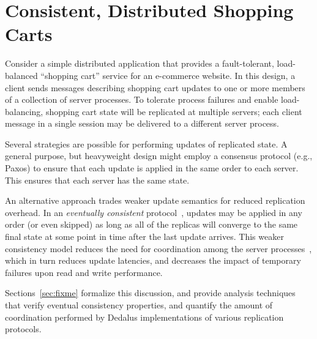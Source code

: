 \section{Consistent, Distributed Shopping Carts}
\label{sec:motivation}

Consider a simple distributed application that provides a fault-tolerant, load-balanced
``shopping cart'' service for an e-commerce website. In this design, a client
sends messages describing shopping cart updates to one or more members of a collection of server
processes. To tolerate process failures and enable load-balancing, shopping cart state will be replicated
at multiple servers; each client message in a single session may be delivered to a different server process.

Several strategies are possible for performing updates of replicated state. A
general purpose, but heavyweight design might employ a consensus protocol (e.g., Paxos\cite{part-time})
to ensure that each update is applied in the same order to each server. This
ensures that each server has the same state.

An alternative approach trades weaker update semantics for reduced
replication overhead.  In an {\em eventually consistent}
protocol~\cite{quicksand,beyond}, updates may be applied in any order
(or even skipped) as long as all of the replicas will converge to the
same final state at some point in time after the last update arrives.
This weaker consistency model reduces the need for coordination among
the server processes~\cite{dynamo}, which in turn reduces update
latencies, and decreases the impact of temporary failures upon read and
write performance.


Sections~\ref{sec:fixme} formalize this discussion, and provide
analysis techniques that verify eventual consistency properties, and
quantify the amount of coordination performed by Dedalus
implementations of various replication protocols.

